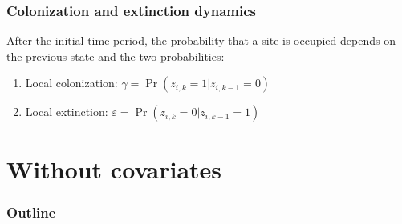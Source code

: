 \documentclass[color=usenames,dvipsnames]{beamer}\usepackage[]{graphicx}\usepackage[]{color}
\begin{document}



\begin{frame}
  \frametitle{Colonization and extinction dynamics}
  After the initial time period, the probability that a site is
  occupied depends on the previous state and the two probabilities:
  \pause
  \begin{enumerate}
    \item<2-> Local colonization: $\gamma=\Pr(z_{i,k}=1|z_{i,k-1}=0)$
    \item<3-> Local extinction: $\varepsilon=\Pr(z_{i,k}=0|z_{i,k-1}=1)$
  \end{enumerate}
  \vfill
\end{frame}


\section{Without covariates}


\begin{frame}
  \frametitle{Outline}
  \Large
  \tableofcontents[currentsection]
\end{frame}
\end{document}

